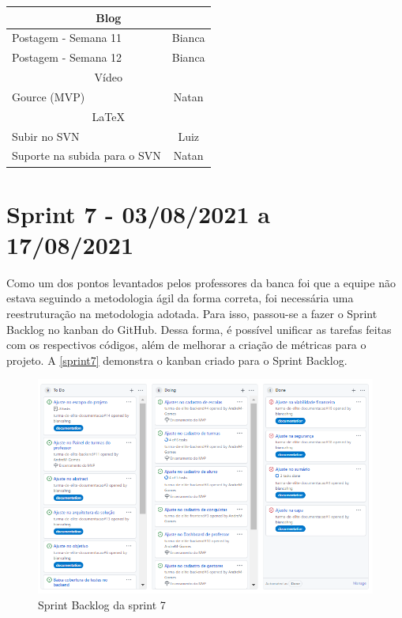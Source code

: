 \begin{apendicesenv}
\begin{quadro}[htb]
\begin{tabular}{|l|c|}
    \multicolumn{2}{|c|}{Blog} \\ \hline
    Postagem - Semana 11      & Bianca     \\ \hline
    Postagem - Semana 12      & Bianca      \\ \hline
    
    \multicolumn{2}{|c|}{Vídeo} \\ \hline
    Gource (MVP) & Natan   \\ \hline 
    
    \multicolumn{2}{|c|}{LaTeX} \\ \hline
    Subir no SVN & Luiz   \\ \hline
    Suporte na subida para o SVN & Natan   \\ \hline
    
\end{tabular}
\end{quadro}
\FloatBarrier

\section{Sprint 7 - 03/08/2021 a 17/08/2021}
Como um dos pontos levantados pelos professores da banca foi que a equipe não estava seguindo a metodologia ágil da forma correta, foi necessária uma reestruturação na metodologia adotada. Para isso, passou-se a fazer o Sprint Backlog no kanban do GitHub. Dessa forma, é possível unificar as tarefas feitas com os respectivos códigos, além de melhorar a criação de métricas para o projeto. A \autoref{sprint7} demonstra o kanban criado para o Sprint Backlog.

\begin{figure}[htb]
    \centering
	\includegraphics[width=16cm]{imagens/sprint7.png}
	\caption{\label{sprint7} Sprint Backlog da sprint 7}
\end{figure}
\FloatBarrier


\end{apendicesenv}

